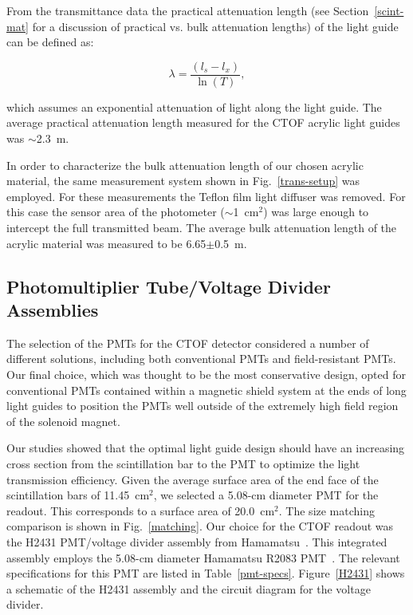 \documentclass{elsart}
\begin{document}
From the transmittance data the practical attenuation length (see Section~\ref{scint-mat} 
for a discussion of practical vs. bulk attenuation lengths) of the light guide can be defined as:

\begin{equation}
\label{pracat}
\lambda= \frac{(l_s-l_x)}{\ln(T)},
\end{equation}

\noindent
which assumes an exponential attenuation of light along the light guide. The average practical 
attenuation length measured for the CTOF acrylic light guides was $\sim$2.3~m.

In order to characterize the bulk attenuation length of our chosen acrylic material, the
same measurement system shown in Fig.~\ref{trans-setup} was employed. For these measurements 
the Teflon film light diffuser was removed. For this case the sensor area of the photometer 
($\sim$1~cm$^2$) was large enough to intercept the full transmitted beam. The average bulk 
attenuation length of the acrylic material was measured to be 6.65$\pm$0.5~m.

\subsection{Photomultiplier Tube/Voltage Divider Assemblies} 
\label{PMTs}

The selection of the PMTs for the CTOF detector considered a number of different solutions,
including both conventional PMTs and field-resistant PMTs. Our final choice, which was 
thought to be the most conservative design, opted for conventional PMTs contained within a
magnetic shield system at the ends of long light guides to position the PMTs well outside of
the extremely high field region of the solenoid magnet.

Our studies showed that the optimal light guide design should have an increasing cross
section from the scintillation bar to the PMT to optimize the light transmission efficiency.
Given the average surface area of the end face of the scintillation bars of 11.45~cm$^2$, we 
selected a 5.08-cm diameter PMT for the readout. This corresponds to a surface area of 
20.0~cm$^2$. The size matching comparison is shown in Fig.~\ref{matching}. Our choice for the 
CTOF readout was the H2431 PMT/voltage divider assembly from Hamamatsu~\cite{ham-ref}.
This integrated assembly employs the 5.08-cm diameter Hamamatsu R2083 PMT~\cite{r2083-ref}.
The relevant specifications for this PMT are listed in Table~\ref{pmt-specs}. Figure~\ref{H2431}
shows a schematic of the H2431 assembly and the circuit diagram for the voltage divider.
\end{document}
